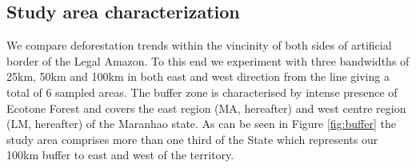 

\subsection{Study area characterization} \label{studycarac} %


We compare deforestation trends within the vincinity of both sides of artificial border of the Legal Amazon.  To this end we experiment with three bandwidths of 25km, 50km and 100km in both east and west direction from the line giving a total of 6 sampled areas. The buffer zone is characterised by intense presence of Ecotone Forest and covers the east region (MA, hereafter) and west centre region (LM, hereafter) of the Maranhao state. As can be seen in Figure \ref{fig:buffer} the study area comprises more than one third of the State which represents our 100km buffer to east and west of the territory.

